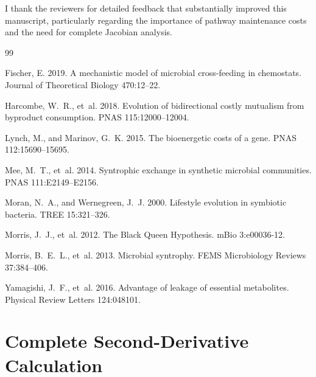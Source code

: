 \documentclass[11pt]{article}
\theoremstyle{definition}
\begin{document}
I thank the reviewers for detailed feedback that substantially improved this manuscript, particularly regarding the importance of pathway maintenance costs and the need for complete Jacobian analysis.



\begin{thebibliography}{99}

Fischer, E. 2019. A mechanistic model of microbial cross-feeding in chemostats. Journal of Theoretical Biology 470:12--22.

Harcombe, W.~R., et~al. 2018. Evolution of bidirectional costly mutualism from byproduct consumption. PNAS 115:12000--12004.

Lynch, M., and Marinov, G.~K. 2015. The bioenergetic costs of a gene. PNAS 112:15690--15695.

Mee, M.~T., et~al. 2014. Syntrophic exchange in synthetic microbial communities. PNAS 111:E2149--E2156.

Moran, N.~A., and Wernegreen, J.~J. 2000. Lifestyle evolution in symbiotic bacteria. TREE 15:321--326.

Morris, J.~J., et~al. 2012. The Black Queen Hypothesis. mBio 3:e00036-12.

Morris, B.~E.~L., et~al. 2013. Microbial syntrophy. FEMS Microbiology Reviews 37:384--406.

Yamagishi, J.~F., et~al. 2016. Advantage of leakage of essential metabolites. Physical Review Letters 124:048101.

\end{thebibliography}

\appendix
\section{Complete Second-Derivative Calculation}
\end{document}
